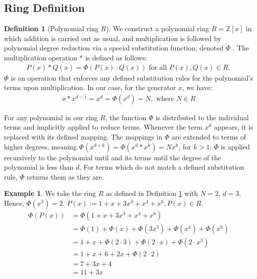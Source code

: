 \documentclass{article}
\theoremstyle{plain}
\theoremstyle{definition}
\newtheorem{definition}{Definition}
\newtheorem{example}{Example}
\begin{document}
\subsection{Ring Definition}

\begin{definition}[Polynomial ring $R$] \label{definition:ring}
We construct a polynomial ring \(R = \mathbb{Z}[x]\) in which addition is carried out as usual, and multiplication is followed by polynomial degree reduction via a special substitution function, denoted $\Phi$ \cite{shunia2023polynomial}. The multiplication operation \(\ast\) is defined as follows:
\begin{align}
P(x) \ast Q(x) = \Phi(P(x) \cdot Q(x)) \text{ for all } P(x), Q(x) \in R,
\end{align}
\(\Phi\) is an operation that enforces any defined substitution rules for the polynomial's terms upon multiplication. In our case, for the generator \(x\), we have:
\begin{align}
x \ast x^{d-1} = x^d = \Phi(x^d) = N, \text{ where } N \in R
\end{align}

For any polynomial in our ring $R$, the function \( \Phi \) is distributed to the individual terms and implicitly applied to reduce terms. Whenever the term $x^d$ appears, it is replaced with its defined mapping. The mappings in $\Phi$ are extended to terms of higher degrees, meaning $\Phi(x^{d+k}) = \Phi(x^d \ast x^k) = N x^k$, for $k > 1$. $\Phi$ is applied recursively to the polynomial until and its terms until the degree of the polynomial is less than $d$. For terms which do not match a defined substitution rule, $\Phi$ returns them as they are.
\end{definition}

\begin{example}
We take the ring $R$ as defined in Definition \ref{definition:ring} with $N = 2$, $d = 3$. Hence, $\Phi(x^3) = 2$. $P(x) := 1 + x + 3x^3 + x^{4} + x^{6}, P(x) \in R$.
\begin{align}
    \Phi(P(x)) &= \Phi(1 + x + 3x^3 + x^{4} + x^{6}) \\
    &= \Phi(1) + \Phi(x) + \Phi(3x^3) + \Phi(x^{4}) + \Phi(x^{6}) \\
    &= 1 + x + \Phi(2 \cdot 3) + \Phi(2 \cdot x) + \Phi(2 \cdot x^3) \\
    &= 1 + x + 6 + 2x + \Phi(2 \cdot 2) \\
    &= 7 + 3x + 4 \\
    &= 11 + 3x
\end{align}
\end{example}
\end{document}
